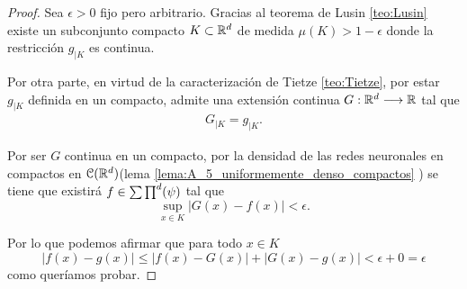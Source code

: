     \reversemarginpar
    \normalmarginpar

    
\begin{proof}
    Sea $\epsilon > 0$ fijo pero arbitrario.  Gracias al teorema de Lusin \ref{teo:Lusin}
    existe un subconjunto compacto $K \subset \mathbb{R}^d$ de medida
    $\mu(K) > 1 - \epsilon$ donde la restricción  $g_{|K}$ es continua. 

    Por otra parte, en virtud de la caracterización de Tietze 
    \ref{teo:Tietze}, 
    por estar $g_{|K}$ definida en un compacto, admite una 
    extensión continua $G:\mathbb{R}^d \longrightarrow \mathbb{R}$ tal que 
    \begin{equation}
        \begin{split}
            G_{|K} = g_{|K} .
        \end{split}
    \end{equation}

    Por ser $G$ continua en un compacto, por la densidad de las redes neuronales en compactos en $\mathcal{C}(\mathbb{R}^d)$(lema \ref{lema:A_5_uniformemente_denso_compactos} ) se tiene que existirá 
     $f \in \sum \prod^d (\psi)$ tal que 
    \begin{equation}
        \sup_{x \in K} |G(x) - f(x)| < \epsilon.
    \end{equation}

    Por lo que podemos afirmar que para todo $x \in K$
    \begin{equation}
        |f(x) -g(x)| 
        \leq 
        | f(x) -G(x)| + |G(x) -g(x)|
        < \epsilon + 0 = \epsilon
    \end{equation}
    como queríamos probar.
\end{proof}


